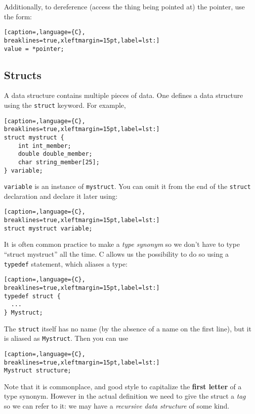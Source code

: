 Additionally, to dereference (access the thing being pointed at) the pointer,
use the form:
\lstset{basicstyle=\scriptsize, numbers=left, captionpos=b, tabsize=4}
\begin{lstlisting}[caption=,language={C},
breaklines=true,xleftmargin=15pt,label=lst:]
value = *pointer;
\end{lstlisting}

\subsection{Structs}
A data structure contains multiple pieces of data.  One defines a data
structure using the \texttt{struct} keyword. For example,
\lstset{basicstyle=\scriptsize, numbers=left, captionpos=b, tabsize=4}
\begin{lstlisting}[caption=,language={C},
breaklines=true,xleftmargin=15pt,label=lst:]
struct mystruct {
    int int_member;
    double double_member;
    char string_member[25];
} variable;
\end{lstlisting}

\texttt{variable} is an instance of \texttt{mystruct}. You can omit it from the
end of the \texttt{struct} declaration and declare it later using:
\lstset{basicstyle=\scriptsize, numbers=left, captionpos=b, tabsize=4}
\begin{lstlisting}[caption=,language={C},
breaklines=true,xleftmargin=15pt,label=lst:]
struct mystruct variable;
\end{lstlisting}

It is often common practice to make a \emph{type synonym} so we don't have to
type ``struct mystruct'' all the time. C allows us the possibility to do so
using a \texttt{typedef} statement, which aliases a type:
\lstset{basicstyle=\scriptsize, numbers=left, captionpos=b, tabsize=4}
\begin{lstlisting}[caption=,language={C},
breaklines=true,xleftmargin=15pt,label=lst:]
typedef struct {
  ...
} Mystruct;
\end{lstlisting}

The \texttt{struct} itself has no name (by the absence of a name on the first
line), but it is aliased as \texttt{Mystruct}. Then you can use
\lstset{basicstyle=\scriptsize, numbers=left, captionpos=b, tabsize=4}
\begin{lstlisting}[caption=,language={C},
breaklines=true,xleftmargin=15pt,label=lst:]
Mystruct structure;
\end{lstlisting}

Note that it is commonplace, and good style to capitalize the \textbf{first
letter} of a type synonym. However in the actual definition we need to give the
struct a \emph{tag} so we can refer to it: we may have a \emph{recursive data
structure} of some kind.

